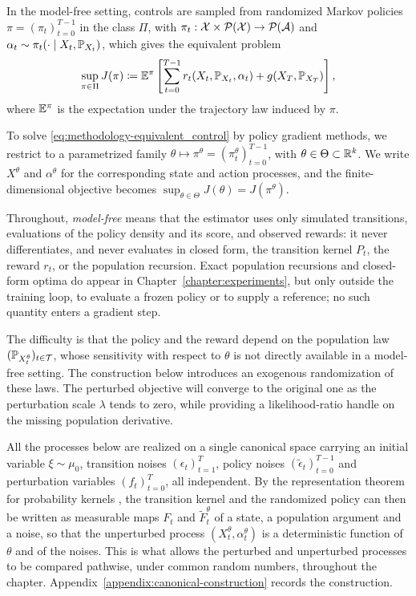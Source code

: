 In the model-free setting, controls are sampled from randomized Markov policies $\pi=(\pi_t)_{t=0}^{T-1}$ in the class $\Pi$, with $\pi_t:\Xc\times\Pc(\Xc)\to\Pc(\Ac)$ and $\alpha_t\sim\pi_t(\cdot\mid X_t,\P_{X_t})$, which gives the equivalent problem
\begin{align}
    \label{eq:methodology-equivalent_control}
    \sup_{\pi\in\Pi} J(\pi) \coloneqq \E^\pi\left[\sum_{t=0}^{T-1}r_t(X_t,\P_{X_t},\alpha_t)+g(X_T,\P_{X_T})\right],
\end{align}
where $\E^\pi$ is the expectation under the trajectory law induced by $\pi$.

To solve \eqref{eq:methodology-equivalent_control} by policy gradient methods, we restrict to a parametrized family $\theta\mapsto\pi^\theta=(\pi_t^\theta)_{t=0}^{T-1}$, with $\theta\in\Theta\subset\R^k$. We write $X^\theta$ and $\alpha^\theta$ for the corresponding state and action processes, and the finite-dimensional objective becomes $\sup_{\theta\in\Theta}J(\theta) = J(\pi^\theta)$.

Throughout, \emph{model-free} means that the estimator uses only simulated transitions, evaluations of the policy density and its score, and observed rewards: it never differentiates, and never evaluates in closed form, the transition kernel $P_t$, the reward $r_t$, or the population recursion. Exact population recursions and closed-form optima do appear in Chapter~\ref{chapter:experiments}, but only outside the training loop, to evaluate a frozen policy or to supply a reference; no such quantity enters a gradient step.

The difficulty is that the policy and the reward depend on the population law $(\P_{X_t^\theta})_{t\in\Tc}$, whose sensitivity with respect to $\theta$ is not directly available in a model-free setting. The construction below introduces an exogenous randomization of these laws. The perturbed objective will converge to the original one as the perturbation scale $\lambda$ tends to zero, while providing a likelihood-ratio handle on the missing population derivative.

All the processes below are realized on a single canonical space carrying an initial variable $\xi\sim\mu_0$, transition noises $(\epsilon_t)_{t=1}^T$, policy noises $(\tilde\epsilon_t)_{t=0}^{T-1}$ and perturbation variables $(f_t)_{t=0}^{T}$, all independent. By the representation theorem for probability kernels \cite{kallenberg1997foundations}, the transition kernel and the randomized policy can then be written as measurable maps $F_t$ and $\tilde F_t^\theta$ of a state, a population argument and a noise, so that the unperturbed process $(X_t^\theta,\alpha_t^\theta)$ is a deterministic function of $\theta$ and of the noises. This is what allows the perturbed and unperturbed processes to be compared pathwise, under common random numbers, throughout the chapter. Appendix~\ref{appendix:canonical-construction} records the construction.

